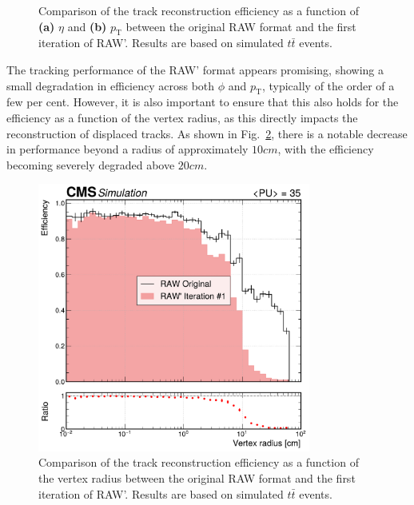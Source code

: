 \begin{figure}[!htbp]
\begin{subfigure}[b]{0.49\textwidth}
            \caption{}
        \end{subfigure}
    \caption[Comparison of the track reconstruction efficiency as a function of $\eta$ and $p_\mathrm{T}$ between the original RAW format and the first iteration of RAW'.]{Comparison of the track reconstruction efficiency as a function of \textbf{(a)} $\eta$ and \textbf{(b)} $p_\mathrm{T}$ between the original RAW format and the first iteration of RAW'. Results are based on simulated $t\bar{t}$ events.} 
    \label{Figure:Chapter5_TrackingPerformance_1}
\end{figure}

The tracking performance of the RAW' format appears promising, showing a small degradation in efficiency across both $\phi$ and $p_\mathrm{T}$, typically of the order of a few per cent. However, it is also important to ensure that this also holds for the efficiency as a function of the vertex radius, as this directly impacts the reconstruction of displaced tracks. As shown in Fig.~\ref{Figure:Chapter5_TrackingPerformance_vertexPos_1}, there is a notable decrease in performance beyond a radius of approximately $10\unit{cm}$, with the efficiency becoming severely degraded above $20\unit{cm}$. 

\begin{figure}[!htbp]
\centering
\includegraphics[width=0.8\textwidth]{Figures/Chapter5/efficiency_comparison_1_vertpos.pdf}
\caption[Comparison of the track reconstruction efficiency as a function of the vertex radius between the original RAW format and the first iteration of RAW'.]{Comparison of the track reconstruction efficiency as a function of the vertex radius between the original RAW format and the first iteration of RAW'. Results are based on simulated $t\bar{t}$ events.} 
\label{Figure:Chapter5_TrackingPerformance_vertexPos_1}
\end{figure}

